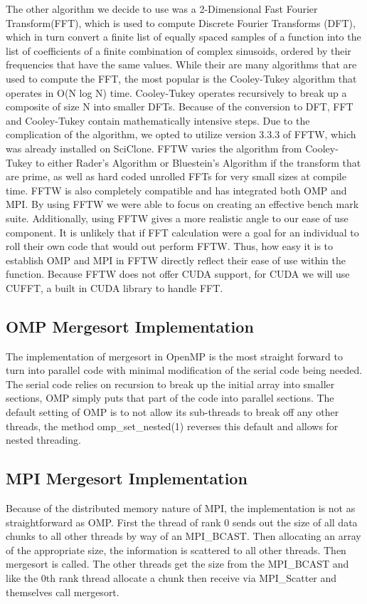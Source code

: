 \documentclass[conference,12pt]{IEEEtran}
\begin{document}
	The other algorithm we decide to use was a 2-Dimensional Fast Fourier Transform(FFT), which is used to compute Discrete Fourier Transforms (DFT), which in turn convert a finite list of equally spaced samples of a function into the list of coefficients of a finite combination of complex 
	sinusoids, ordered by their frequencies that have the same values. While their are many algorithms that are used to compute the FFT, the most popular is the Cooley-Tukey algorithm that operates in O(N log N) time.  Cooley-Tukey operates recursively to break up a composite of size N
	into smaller DFTs.  Because of the conversion to DFT, FFT and Cooley-Tukey contain mathematically intensive steps.  Due to the complication of the algorithm, we opted to utilize version 3.3.3 of FFTW, which was already installed on SciClone.  FFTW varies the algorithm from Cooley-Tukey to 
	either Rader's Algorithm or Bluestein's Algorithm if the  transform that are prime, as well as hard coded unrolled FFTs for very small sizes at compile time.  FFTW is also completely compatible and has integrated both OMP and MPI.  By using FFTW we were able to focus on creating an effective
	bench mark suite.  Additionally, using FFTW gives a more realistic angle to our ease of use component.  It is unlikely that if FFT calculation were a goal for an individual to roll their own code that would out perform FFTW.  Thus, how easy it is to establish OMP and MPI in FFTW directly 
	reflect their ease of use within the function.  Because FFTW does not offer CUDA support, for CUDA we will use CUFFT, a built in CUDA library to handle FFT.

	\subsection{OMP Mergesort Implementation}   
		The implementation of mergesort in OpenMP is the most straight forward to turn into parallel code with minimal modification of the serial code being needed.  The serial code relies on recursion to break up the initial array into smaller sections, OMP simply puts that part of the code into parallel sections.  The default setting of OMP is to not allow its sub-threads to break off any other threads, the method omp\_set\_nested(1) reverses this default and allows for nested threading.

	\subsection{MPI Mergesort Implementation}
		Because of the distributed memory nature of MPI, the implementation is not as straightforward as OMP.  First the thread of rank 0 sends out the size of all data chunks to all other threads by way of an MPI\_BCAST.  Then allocating an array of the appropriate size, the information is scattered to all other threads.  
		Then mergesort is called.  The other threads get the size from the MPI\_BCAST and like the 0th rank thread allocate a chunk then receive via MPI\_Scatter and themselves call mergesort.
\end{document}

